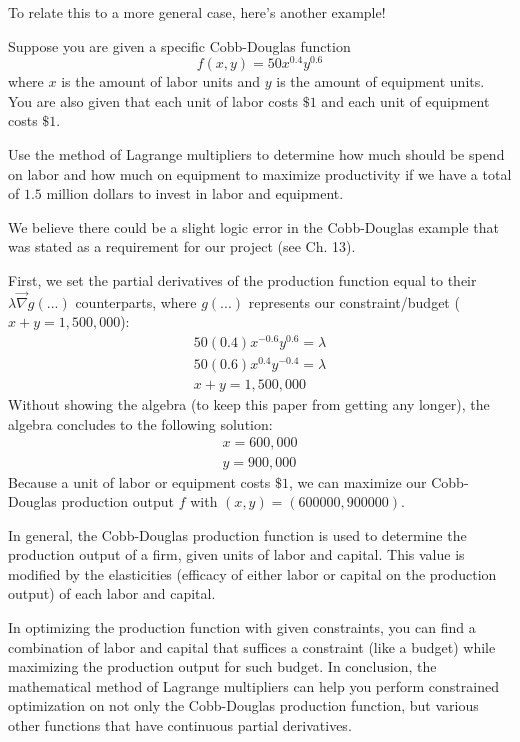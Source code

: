 To relate this to a more general case, here's another example!
\begin{eg}
	Suppose you are given a specific Cobb-Douglas function \[f(x, y) = 50x^{0.4}y^{0.6}\] where $x$ is the amount of labor units and $y$ is the amount of equipment units.
	You are also given that each unit of labor costs $\$1$ and each unit of equipment costs $\$1$.
	
	Use the method of Lagrange multipliers to determine how much should be spend on labor and how much on equipment to maximize productivity if we have a total of $1.5$ million dollars to invest in labor and equipment.
	
	We believe there could be a slight logic error in the Cobb-Douglas example that was stated as a requirement for our project (see Ch. 13).
\end{eg}

\pagebreak
First, we set the partial derivatives of the production function equal to their $\lambda \vec{\nabla}g(...)$ counterparts, where $g(...)$ represents our constraint/budget ($x + y = 1,500,000$):
\begin{align*}
	50(0.4)x^{-0.6}y^{0.6} = \lambda\\
	50(0.6)x^{0.4}y^{-0.4} = \lambda\\
	x + y = 1,500,000
\end{align*}
Without showing the algebra (to keep this paper from getting any longer), the algebra concludes to the following solution:
\begin{align*}
	x = 600,000\\
	y = 900,000
\end{align*}
Because a unit of labor or equipment costs $\$1$, we can maximize our Cobb-Douglas production output $f$ with $(x,y)=(600000, 900000)$.

In general, the Cobb-Douglas production function is used to determine the production output of a firm, given units of labor and capital.
This value is modified by the elasticities (efficacy of either labor or capital on the production output) of each labor and capital.

In optimizing the production function with given constraints, you can find a combination of labor and capital that suffices a constraint (like a budget) while maximizing the production output for such budget.
In conclusion, the mathematical method of Lagrange multipliers can help you perform constrained optimization on not only the Cobb-Douglas production function, but various other functions that have continuous partial derivatives.